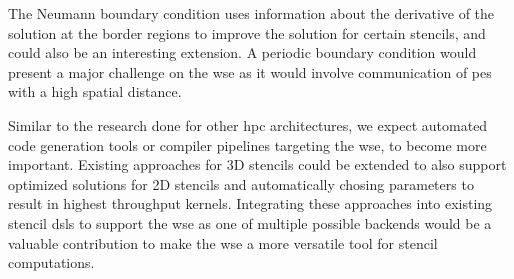 The Neumann boundary condition uses information about the derivative of the solution at the border regions to improve the solution for certain stencils, and could also be an interesting extension. A periodic boundary condition would present a major challenge on the \ac{wse} as it would involve communication of \acp{pe} with a high spatial distance. 

Similar to the research done for other \ac{hpc} architectures, we expect automated code generation tools or compiler pipelines targeting the \ac{wse}, to become more important.
Existing approaches for 3D stencils\cite{sai2024automated} could be extended to also support optimized solutions for 2D stencils and automatically chosing parameters to result in highest throughput kernels.
Integrating these approaches into existing stencil \acp{dsl} to support the \ac{wse} as one of multiple possible backends would be a valuable contribution to make the \ac{wse} a more versatile tool for stencil computations.


